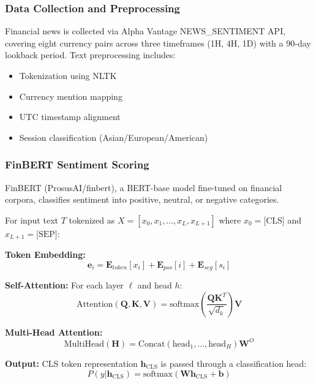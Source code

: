 \documentclass[conference]{IEEEtran}
\begin{document}
\subsubsection{Data Collection and Preprocessing}
Financial news is collected via Alpha Vantage NEWS\_SENTIMENT API, covering eight currency pairs across three timeframes (1H, 4H, 1D) with a 90-day lookback period. Text preprocessing includes:
\begin{itemize}
\item Tokenization using NLTK
\item Currency mention mapping
\item UTC timestamp alignment
\item Session classification (Asian/European/American)
\end{itemize}

\subsubsection{FinBERT Sentiment Scoring}
FinBERT (ProsusAI/finbert), a BERT-base model fine-tuned on financial corpora, classifies sentiment into positive, neutral, or negative categories.

For input text $T$ tokenized as $X = [x_0, x_1, \ldots, x_L, x_{L+1}]$ where $x_0 = \text{[CLS]}$ and $x_{L+1} = \text{[SEP]}$:

\textbf{Token Embedding:}
\begin{equation}
\mathbf{e}_i = \mathbf{E}_{token}[x_i] + \mathbf{E}_{pos}[i] + \mathbf{E}_{seg}[s_i]
\end{equation}

\textbf{Self-Attention:} For each layer $\ell$ and head $h$:
\begin{equation}
\text{Attention}(\mathbf{Q}, \mathbf{K}, \mathbf{V}) = \text{softmax}\left(\frac{\mathbf{Q}\mathbf{K}^T}{\sqrt{d_k}}\right)\mathbf{V}
\end{equation}

\textbf{Multi-Head Attention:}
\begin{equation}
\text{MultiHead}(\mathbf{H}) = \text{Concat}(\text{head}_1, \ldots, \text{head}_H)\mathbf{W}^O
\end{equation}

\textbf{Output:} CLS token representation $\mathbf{h}_{\text{CLS}}$ is passed through a classification head:
\begin{equation}
P(y|\mathbf{h}_{\text{CLS}}) = \text{softmax}(\mathbf{W}\mathbf{h}_{\text{CLS}} + \mathbf{b})
\end{equation}
\end{document}
